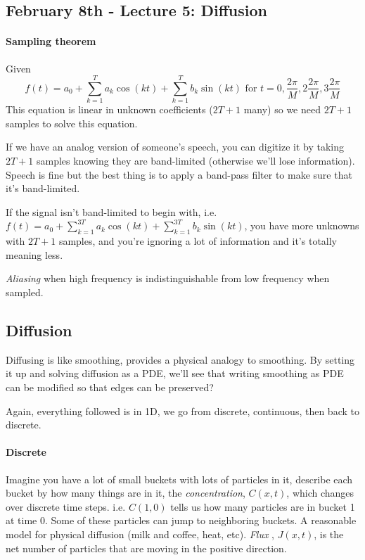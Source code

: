 \pagebreak

\subsection{February 8th - Lecture 5: Diffusion}
\label{sec:lecture-5}

\paragraph{Sampling theorem}
\label{sec:sampling-theorem}
Given $$f(t) = a_0 + \sum_{k=1}^T a_k \cos(kt) + \sum_{k=1}^Tb_k\sin(
kt) \text{ for } t=0, \frac{2\pi}{M}, 2\frac{2\pi}{M}, 3\frac{2\pi}{M}$$
This equation is linear in unknown coefficients ($2T+1$ many) so we need
$2T+1$ samples to solve this equation.

If we have an analog version of someone's speech, you can digitize it
by taking $2T+1$ samples knowing they are band-limited (otherwise
we'll lose information). Speech is fine but the best thing is to apply a band-pass filter to make sure that
it's band-limited.

If the signal isn't band-limited to begin with, i.e. 
$f(t) = a_0 + \sum_{k=1}^{3T} a_k \cos(kt) + \sum_{k=1}^{3T} b_k\sin(
kt) $, you have more unknowns with $2T+1$ samples, and you're ignoring
a lot of information and it's totally meaning less.

\emph{Aliasing} when high frequency is indistinguishable from low
frequency when sampled.

\subsection{Diffusion}
\label{sec:diffusion}
Diffusing is like smoothing, provides a physical analogy to
smoothing. By setting it up and solving diffusion as a PDE, we'll see that
writing smoothing as PDE can be modified so that edges can be
preserved?

Again, everything followed is in 1D, we go from discrete, continuous,
then back to discrete.

\paragraph{Discrete}
\label{sec:discrete}
Imagine you have a lot of small buckets with lots of particles in it,
describe each bucket by how many things are in it, the
\emph{concentration}, $C(x,t)$, which changes over discrete time steps. 
i.e. $C(1,0)$ tells us how many particles are in bucket 1 at time 0.
Some of these particles can jump to neighboring buckets. A reasonable
model for physical diffusion (milk and coffee, heat, etc).
\emph{Flux} , $J(x,t)$, is the net number of particles that are moving in the
positive direction.

